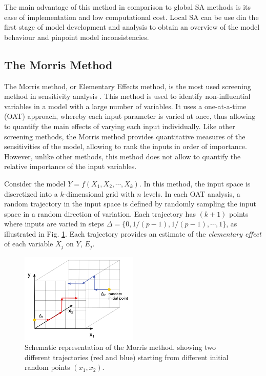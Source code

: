 \documentclass[12pt]{article}
\begin{document}
\vspace{0.5cm}
The main advantage of this method in comparison to global SA methods is its ease of implementation and low computational cost. Local SA can be use din the first stage of model development and analysis to obtain an overview of the model behaviour and pinpoint model inconsistencies. 

\subsection{The Morris Method}

The Morris method, or Elementary Effects method, is the most used screening method in sensitivity analysis \cite{Morris1991}. This method is used to identify non-influential variables in a model with a large number of variables. It uses a one-at-a-time (OAT) approach, whereby each input parameter is varied at once, thus allowing to quantify the main effects of varying each input individually. Like other screening methods, the Morris method provides quantitative measures of the sensitivities of the model, allowing to rank the inputs in order of importance. However, unlike other methods, this method does not allow to quantify the relative importance of the input variables. 

Consider the model $Y=f(X_{1}, X_{2}, \cdots, X_{k})$. In this method, the input space is discretized into a $k$-dimensional grid with $n$ levels. In each OAT analysis, a random trajectory in the input space is defined by randomly sampling the input space in a random direction of variation. Each trajectory has $(k+1)$ points where inputs are varied in steps $\Delta=\{0, 1/(p-1), 1/(p-1), \cdots, 1\}$, as illustrated in Fig. \ref{fig:Morris}. Each trajectory provides an estimate of the \textit{elementary effect} of each variable $X_{j}$ on $Y$, $E_{j}$. 

 \begin{figure}[h]
	\centering
	\includegraphics[width=0.5\textwidth]{images/Morris.png}
	\caption{Schematic representation of the Morris method, showing two different trajectories (red and blue) starting from different initial random points $(x_{1},x_{2})$.}
	\label{fig:Morris}
\end{figure}
\end{document}
